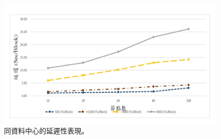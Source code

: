 \begin{figure}[h]
\centering
\includegraphics[scale=0.50]{images/62.jpg}
\caption{同資料中心的延遲性表現。}
\label{i:byz-latency}
\end{figure}
